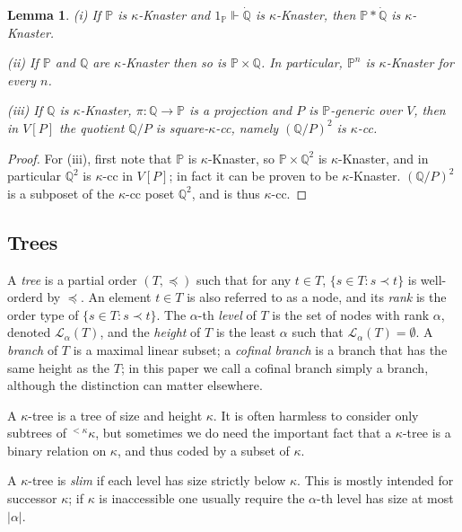 \documentclass[10pt,reqno]{amsart}
\theoremstyle{plain}
\newtheorem{lemma}[theorem]{Lemma}
\theoremstyle{definition}
\theoremstyle{remark}
\begin{document}
\begin{lemma}\label{forcing_Knaster}
(i) If $\mathbb{P}$ is $\kappa$-Knaster and $1_{\mathbb{P}}\Vdash\dot{\mathbb{Q}}$ is $\kappa$-Knaster, then $\mathbb{P}*\dot{\mathbb{Q}}$ is $\kappa$-Knaster.

(ii) If $\mathbb{P}$ and $\mathbb{Q}$ are $\kappa$-Knaster then so is $\mathbb{P}\times\mathbb{Q}$. In particular, $\mathbb{P}^n$ is $\kappa$-Knaster for every $n$.

(iii) If $\mathbb{Q}$ is $\kappa$-Knaster, $\pi:\mathbb{Q}\rightarrow\mathbb{P}$ is a projection and $P$ is $\mathbb{P}$-generic over $V$, then in $V[P]$ the quotient $\mathbb{Q}/P$ is square-$\kappa$-cc, namely $(\mathbb{Q}/P)^2$ is $\kappa$-cc.
\end{lemma}
\begin{proof}
For (iii), first note that $\mathbb{P}$ is $\kappa$-Knaster, so $\mathbb{P}\times\mathbb{Q}^2$ is $\kappa$-Knaster, and in particular $\mathbb{Q}^2$ is $\kappa$-cc in $V[P]$; in fact it can be proven to be $\kappa$-Knaster. $(\mathbb{Q}/P)^2$ is a subposet of the $\kappa$-cc poset $\mathbb{Q}^2$, and is thus $\kappa$-cc.
\end{proof}



\subsection{Trees}

A \textit{tree} is a partial order $(T,\preceq)$ such that for any $t\in T$, $\{s\in T:s\prec t\}$ is well-orderd by $\preceq$. An element $t\in T$ is also referred to as a node, and its \textit{rank} is the order type of $\{s\in T:s\prec t\}$. The $\alpha$-th \textit{level} of $T$ is the set of nodes with rank $\alpha$, denoted $\mathcal{L}_\alpha(T)$, and the \textit{height} of $T$ is the least $\alpha$ such that $\mathcal{L}_\alpha(T)=\emptyset$. A \textit{branch} of $T$ is a maximal linear subset; a \textit{cofinal branch} is a branch that has the same height as the $T$; in this paper we call a cofinal branch simply a branch, although the distinction can matter elsewhere.

A $\kappa$-tree is a tree of size and height $\kappa$. It is often harmless to consider only subtrees of ${}^{<\kappa}\kappa$, but sometimes we do need the important fact that a $\kappa$-tree is a binary relation on $\kappa$, and thus coded by a subset of $\kappa$.

A $\kappa$-tree is \textit{slim} if each level has size strictly below $\kappa$. This is mostly intended for successor $\kappa$; if $\kappa$ is inaccessible one usually require the $\alpha$-th level has size at most $|\alpha|$. 
\end{document}
